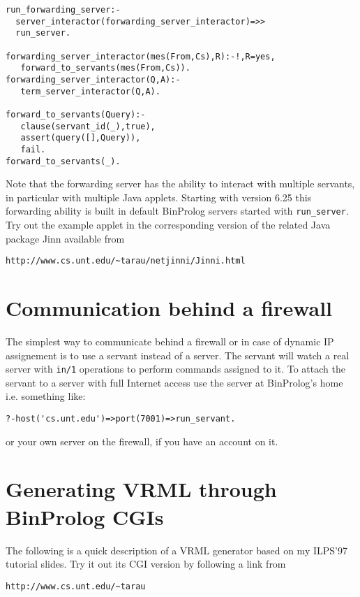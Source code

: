 \documentclass{article}
\begin{document}
{\small \begin{verbatim}
run_forwarding_server:-
  server_interactor(forwarding_server_interactor)=>>
  run_server.

forwarding_server_interactor(mes(From,Cs),R):-!,R=yes,
   forward_to_servants(mes(From,Cs)).
forwarding_server_interactor(Q,A):-
   term_server_interactor(Q,A).

forward_to_servants(Query):-
   clause(servant_id(_),true),
   assert(query([],Query)),
   fail.
forward_to_servants(_).
\end{verbatim}}

Note that the forwarding server has the ability
to interact with multiple servants, in particular
with multiple Java applets.
Starting with version 6.25 this forwarding ability
is built in default BinProlog servers started
with {\tt run\_server}.
Try out the example applet in the corresponding version of
the related Java package Jinn available
from 
\begin{verbatim}
http://www.cs.unt.edu/~tarau/netjinni/Jinni.html
\end{verbatim}
 
\section{Communication behind a firewall}
The simplest way to communicate behind a firewall or in case
of dynamic IP assignement is to
use a servant instead of a server. The servant will
watch a real server with {\tt in/1} operations to perform
commands assigned to it. 
To attach the servant to a server with full Internet access
use the server at BinProlog's home i.e. something like:

\begin{verbatim}
?-host('cs.unt.edu')=>port(7001)=>run_servant.
\end{verbatim}

or your own server on the firewall, if you have an account on it.


\section{Generating VRML through BinProlog CGIs}

The following is a quick description of a VRML generator based on my
ILPS'97 tutorial slides. Try it out its CGI version by following a link
from

\begin{verbatim}
http://www.cs.unt.edu/~tarau
\end{verbatim}
\end{document}
